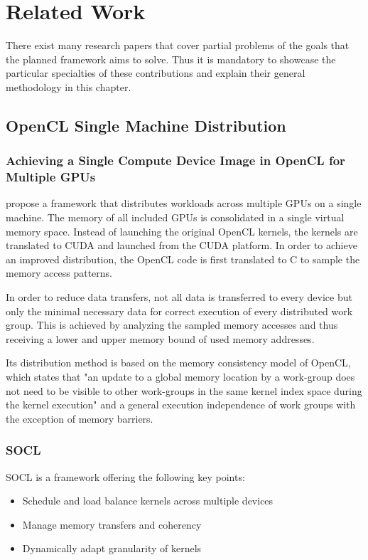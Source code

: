 \chapter{Related Work}
\label{related}

There exist many research papers that cover partial problems of the goals that the planned framework aims to solve. Thus it is mandatory to showcase the particular specialties of these contributions and explain their general methodology in this chapter.

\section{OpenCL Single Machine Distribution}

\subsection*{Achieving a Single Compute Device Image in OpenCL for Multiple GPUs}
\citeauthor{Kim_2011} propose a framework that distributes workloads across multiple GPUs on a single machine\cite{Kim_2011}. The memory of all included GPUs is consolidated in a single virtual memory space.
Instead of launching the original OpenCL kernels, the kernels are translated to CUDA and launched from the CUDA platform. In order to achieve an improved distribution, the OpenCL code is first translated to C to sample the memory access patterns.

In order to reduce data transfers, not all data is transferred to every device but only the minimal necessary data for correct execution of every distributed work group. This is achieved by analyzing the sampled memory accesses and thus receiving a lower and upper memory bound of used memory addresses.

Its distribution method is based on the memory consistency model of OpenCL, which states that "an update to a global memory location by a work-group does not need to be visible to other work-groups in the same kernel index space during the kernel execution" and a general execution independence of work groups with the exception of memory barriers.

\subsection*{SOCL\cite{socl}}
SOCL is a framework offering the following key points:
\begin{itemize}
    \item Schedule and load balance kernels across multiple devices
    \item Manage memory transfers and coherency
    \item Dynamically adapt granularity of kernels
\end{itemize}

